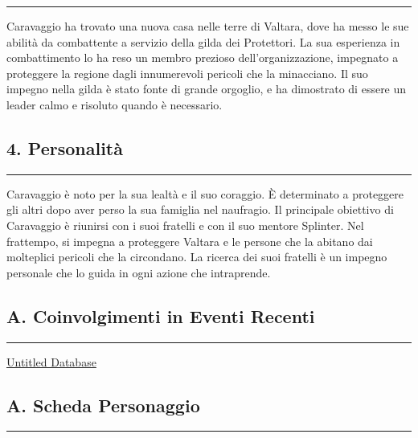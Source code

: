 \begin{center}\rule{0.5\linewidth}{0.5pt}\end{center}

Caravaggio ha trovato una nuova casa nelle terre di Valtara, dove ha
messo le sue abilità da combattente a servizio della gilda dei
Protettori. La sua esperienza in combattimento lo ha reso un membro
prezioso dell'organizzazione, impegnato a proteggere la regione dagli
innumerevoli pericoli che la minacciano. Il suo impegno nella gilda è
stato fonte di grande orgoglio, e ha dimostrato di essere un leader
calmo e risoluto quando è necessario.

\subsection{4. Personalità}\label{personalituxe0}

\begin{center}\rule{0.5\linewidth}{0.5pt}\end{center}

Caravaggio è noto per la sua lealtà e il suo coraggio. È determinato a
proteggere gli altri dopo aver perso la sua famiglia nel naufragio. Il
principale obiettivo di Caravaggio è riunirsi con i suoi fratelli e con
il suo mentore Splinter. Nel frattempo, si impegna a proteggere Valtara
e le persone che la abitano dai molteplici pericoli che la circondano.
La ricerca dei suoi fratelli è un impegno personale che lo guida in ogni
azione che intraprende.

\subsection{A. Coinvolgimenti in Eventi
Recenti}\label{a.-coinvolgimenti-in-eventi-recenti}

\begin{center}\rule{0.5\linewidth}{0.5pt}\end{center}

\href{Untitled\%20Database\%2001e713b9a2ea4437bbcda3f45f19839d.csv}{Untitled
Database}

\subsection{A. Scheda Personaggio}\label{a.-scheda-personaggio}

\begin{center}\rule{0.5\linewidth}{0.5pt}\end{center}

